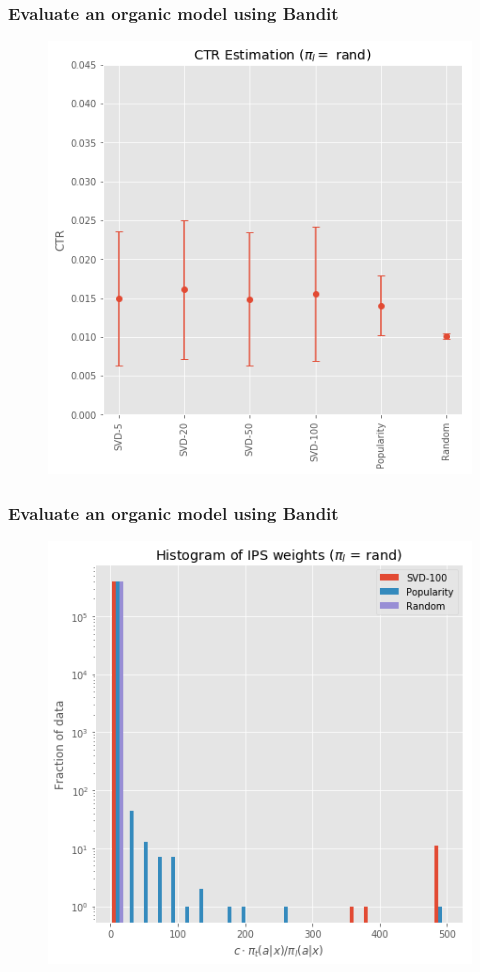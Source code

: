 \begin{frame}
  \frametitle{Evaluate an organic model using Bandit}
\begin{figure}[h!]
\includegraphics[scale=0.4]{images/evalorganicwithbandit3.png}
\centering
\label{motex1}
\end{figure}
\end{frame}

\begin{frame}
  \frametitle{Evaluate an organic model using Bandit}
\begin{figure}[h!]
\includegraphics[scale=0.4]{images/evalorganicwithbandit4.png}
\centering
\label{motex1}
\end{figure}
\end{frame}

